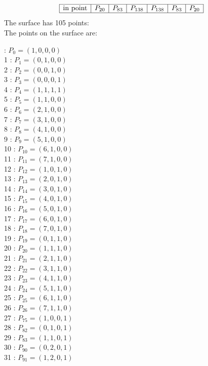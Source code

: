 \documentclass{article}
\begin{document}
{$$\begin{array}{|r*{6}{|c}|}
\hline
\mbox{in point}  & P_{20} & P_{83} & P_{138} & P_{138} & P_{83} & P_{20}\\
\hline
\end{array}
$$
The surface has 105 points:\\
The points on the surface are:\\
\begin{multicols}{3}
 : $P_{0}=( 1, 0, 0, 0 )$\\
1 : $P_{1}=( 0, 1, 0, 0 )$\\
2 : $P_{2}=( 0, 0, 1, 0 )$\\
3 : $P_{3}=( 0, 0, 0, 1 )$\\
4 : $P_{4}=( 1, 1, 1, 1 )$\\
5 : $P_{5}=( 1, 1, 0, 0 )$\\
6 : $P_{6}=( 2, 1, 0, 0 )$\\
7 : $P_{7}=( 3, 1, 0, 0 )$\\
8 : $P_{8}=( 4, 1, 0, 0 )$\\
9 : $P_{9}=( 5, 1, 0, 0 )$\\
10 : $P_{10}=( 6, 1, 0, 0 )$\\
11 : $P_{11}=( 7, 1, 0, 0 )$\\
12 : $P_{12}=( 1, 0, 1, 0 )$\\
13 : $P_{13}=( 2, 0, 1, 0 )$\\
14 : $P_{14}=( 3, 0, 1, 0 )$\\
15 : $P_{15}=( 4, 0, 1, 0 )$\\
16 : $P_{16}=( 5, 0, 1, 0 )$\\
17 : $P_{17}=( 6, 0, 1, 0 )$\\
18 : $P_{18}=( 7, 0, 1, 0 )$\\
19 : $P_{19}=( 0, 1, 1, 0 )$\\
20 : $P_{20}=( 1, 1, 1, 0 )$\\
21 : $P_{21}=( 2, 1, 1, 0 )$\\
22 : $P_{22}=( 3, 1, 1, 0 )$\\
23 : $P_{23}=( 4, 1, 1, 0 )$\\
24 : $P_{24}=( 5, 1, 1, 0 )$\\
25 : $P_{25}=( 6, 1, 1, 0 )$\\
26 : $P_{26}=( 7, 1, 1, 0 )$\\
27 : $P_{75}=( 1, 0, 0, 1 )$\\
28 : $P_{82}=( 0, 1, 0, 1 )$\\
29 : $P_{83}=( 1, 1, 0, 1 )$\\
30 : $P_{90}=( 0, 2, 0, 1 )$\\
31 : $P_{91}=( 1, 2, 0, 1 )$\\

\end{multicols}}
\end{document}
